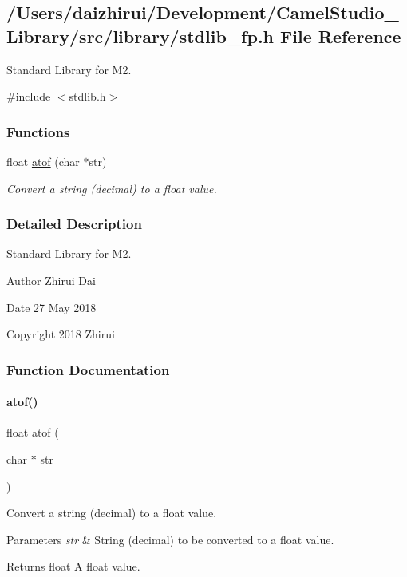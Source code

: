 \hypertarget{a00068}{}\subsection{/\+Users/daizhirui/\+Development/\+Camel\+Studio\+\_\+\+Library/src/library/stdlib\+\_\+fp.h File Reference}
\label{a00068}


Standard Library for M2.  


{\ttfamily \#include $<$stdlib.\+h$>$}\newline
\subsubsection*{Functions}
\begin{DoxyCompactItemize}
\item 
float \mbox{\hyperlink{a00068_a40bb24dc7d4d98600cd976323cea17e0}{atof}} (char $\ast$str)
\begin{DoxyCompactList}\small\item\em Convert a string (decimal) to a float value. \end{DoxyCompactList}\end{DoxyCompactItemize}


\subsubsection{Detailed Description}
Standard Library for M2. 

\begin{DoxyAuthor}{Author}
Zhirui Dai 
\end{DoxyAuthor}
\begin{DoxyDate}{Date}
27 May 2018 
\end{DoxyDate}
\begin{DoxyCopyright}{Copyright}
2018 Zhirui 
\end{DoxyCopyright}


\subsubsection{Function Documentation}
\mbox{\label{a00068_a40bb24dc7d4d98600cd976323cea17e0}} 
\paragraph{\texorpdfstring{atof()}{atof()}}
{\footnotesize\ttfamily float atof (\begin{DoxyParamCaption}\item[{char $\ast$}]{str }\end{DoxyParamCaption})}



Convert a string (decimal) to a float value. 


\begin{DoxyParams}{Parameters}
{\em str} & String (decimal) to be converted to a float value. \\
\hline
\end{DoxyParams}
\begin{DoxyReturn}{Returns}
float A float value. 
\end{DoxyReturn}
